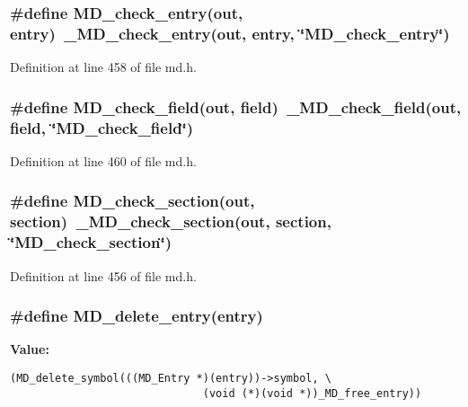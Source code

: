 \subsubsection{\setlength{\rightskip}{0pt plus 5cm}\#define MD\_\-check\_\-entry(out, \bf{entry})~\_\-MD\_\-check\_\-entry(out, \bf{entry}, \char`\"{}MD\_\-check\_\-entry\char`\"{})}\label{md_8h_b23d543dfe7d87d59d787e98f4dc99c2}




Definition at line 458 of file md.h.
\subsubsection{\setlength{\rightskip}{0pt plus 5cm}\#define MD\_\-check\_\-field(out, field)~\_\-MD\_\-check\_\-field(out, field, \char`\"{}MD\_\-check\_\-field\char`\"{})}\label{md_8h_bff3ad7ae0ad8ef33f2577a7b1d97f5e}




Definition at line 460 of file md.h.
\subsubsection{\setlength{\rightskip}{0pt plus 5cm}\#define MD\_\-check\_\-section(out, section)~\_\-MD\_\-check\_\-section(out, section, \char`\"{}MD\_\-check\_\-section\char`\"{})}\label{md_8h_17bc2b59f9083662c2d1350f3309875d}




Definition at line 456 of file md.h.
\subsubsection{\setlength{\rightskip}{0pt plus 5cm}\#define MD\_\-delete\_\-entry(\bf{entry})}\label{md_8h_d90f29f9c1e93c7269b8cd426ef3a563}


\textbf{Value:}

\begin{Code}\begin{verbatim}(MD_delete_symbol(((MD_Entry *)(entry))->symbol, \
                              (void (*)(void *))_MD_free_entry))
\end{verbatim}\end{Code}


